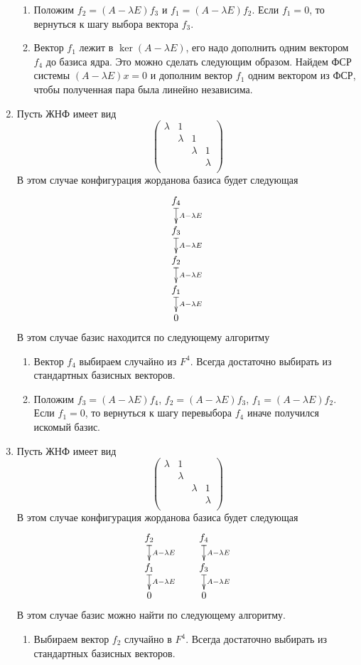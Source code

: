 \documentclass{article}
\begin{document}
\begin{enumerate}
\begin{enumerate}
\item Положим $f_2 = (A - \lambda E) f_3$ и $f_1 = (A - \lambda E) f_2$.
Если $f_1 = 0$, то вернуться к шагу выбора вектора $f_3$.

\item Вектор $f_1$ лежит в $\ker (A - \lambda E)$, его надо дополнить одним вектором $f_4$ до базиса ядра.
Это можно сделать следующим образом.
Найдем ФСР системы $(A - \lambda E)x = 0$ и дополним вектор $f_1$ одним вектором из ФСР, чтобы полученная пара была линейно независима.
\end{enumerate}

\item Пусть ЖНФ имеет вид
\[
\begin{pmatrix}
{\lambda}&{1}&{}&{}\\
{}&{\lambda}&{1}&{}\\
{}&{}&{\lambda}&{1}\\
{}&{}&{}&{\lambda}\\
\end{pmatrix}
\]
В этом случае конфигурация жорданова базиса будет следующая
\[
\xymatrix@R=15pt@C=40pt{
  {f_4}\ar@{|->}[d]^{A-\lambda E}\\
  {f_3}\ar@{|->}[d]^{A-\lambda E}\\
  {f_2}\ar@{|->}[d]^{A-\lambda E}\\
  {f_1}\ar@{|->}[d]^{A-\lambda E}\\
  {0}
}
\]
В этом случае базис находится по следующему алгоритму
\begin{enumerate}
\item Вектор $f_4$ выбираем случайно из $F^4$.
Всегда достаточно выбирать из стандартных базисных векторов.

\item Положим $f_3 = (A - \lambda E) f_4$, $f_2 = (A - \lambda E) f_3$, $f_1 = (A - \lambda E) f_2$.
Если $f_1 = 0$, то вернуться к шагу перевыбора $f_4$ иначе получился искомый базис.
\end{enumerate}

\item Пусть ЖНФ имеет вид
\[
\begin{pmatrix}
{\lambda}&{1}&{}&{}\\
{}&{\lambda}&{}&{}\\
{}&{}&{\lambda}&{1}\\
{}&{}&{}&{\lambda}\\
\end{pmatrix}
\]
В этом случае конфигурация жорданова базиса будет следующая
\[
\xymatrix@R=15pt@C=40pt{
  {f_2}\ar@{|->}[d]^{A-\lambda E}&{f_4}\ar@{|->}[d]^{A-\lambda E}\\
  {f_1}\ar@{|->}[d]^{A-\lambda E}&{f_3}\ar@{|->}[d]^{A-\lambda E}\\
  {0}&{0}
}
\]
В этом случае базис можно найти по следующему алгоритму.
\begin{enumerate}
\item Выбираем вектор $f_2$ случайно в $F^4$.
Всегда достаточно выбирать из стандартных базисных векторов.


\end{enumerate}
\end{enumerate}
\end{document}
